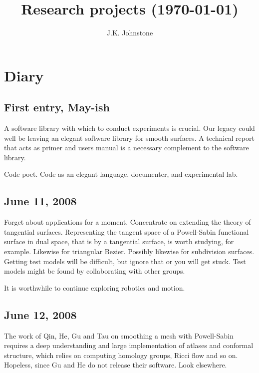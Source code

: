 \documentclass[11pt]{article}
\title{Research projects (\today)}
\author{J.K. Johnstone}
\begin{document}
\vspace{-2in}

\maketitle

\tableofcontents

\clearpage

\section{Diary}

\subsection{First entry, May-ish}

A software library with which to conduct experiments is crucial.
Our legacy could well be leaving an elegant software library for smooth surfaces.
A technical report that acts as primer and users manual is a necessary complement
to the software library.

Code poet.
Code as an elegant language, documenter, and experimental lab.

\subsection{June 11, 2008}

Forget about applications for a moment.
Concentrate on extending the theory of tangential surfaces.
Representing the tangent space of a Powell-Sabin functional surface in dual space,
that is by a tangential surface, is worth studying, for example.
Likewise for triangular Bezier.
Possibly likewise for subdivision surfaces.
Getting test models will be difficult, but ignore that or you will get stuck.
Test models might be found by collaborating with other groups.

It is worthwhile to continue exploring robotics and motion.

\subsection{June 12, 2008}

The work of Qin, He, Gu and Tau on smoothing a mesh with Powell-Sabin requires a deep
understanding and large implementation of atlases and conformal structure, which relies on 
computing homology groups, Ricci flow and so on.  Hopeless, since Gu and He do not release
their software.  Look elsewhere.
\end{document}
